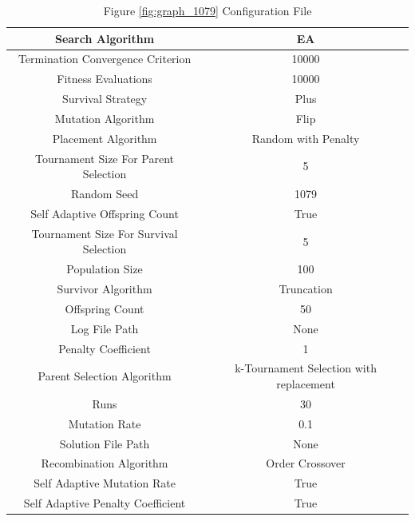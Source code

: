 \documentclass{standalone}
\begin{document}
\begin{table}[!htb]
	\centering
	\caption{Figure \ref{fig:graph_1079} Configuration File}
	\label{tab:graph_1079}
	\begin{tabular}{| c | c |}
		\hline
		Search Algorithm		& EA		 \\
		\hline
		Termination Convergence Criterion		& 10000		 \\
		\hline
		Fitness Evaluations		& 10000		 \\
		\hline
		Survival Strategy		& Plus		 \\
		\hline
		Mutation Algorithm		& Flip		 \\
		\hline
		Placement Algorithm		& Random with Penalty		 \\
		\hline
		Tournament Size For Parent Selection		& 5		 \\
		\hline
		Random Seed		& 1079		 \\
		\hline
		Self Adaptive Offspring Count		& True		 \\
		\hline
		Tournament Size For Survival Selection		& 5		 \\
		\hline
		Population Size		& 100		 \\
		\hline
		Survivor Algorithm		& Truncation		 \\
		\hline
		Offspring Count		& 50		 \\
		\hline
		Log File Path		& None		 \\
		\hline
		Penalty Coefficient		& 1		 \\
		\hline
		Parent Selection Algorithm		& k-Tournament Selection with replacement		 \\
		\hline
		Runs		& 30		 \\
		\hline
		Mutation Rate		& 0.1		 \\
		\hline
		Solution File Path		& None		 \\
		\hline
		Recombination Algorithm		& Order Crossover		 \\
		\hline
		Self Adaptive Mutation Rate		& True		 \\
		\hline
		Self Adaptive Penalty Coefficient		& True		 \\
		\hline
	\end{tabular}
\end{table}
\end{document}
